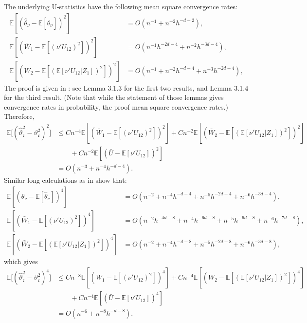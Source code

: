 \documentclass[11pt]{article}
\numberwithin{equation}{section}
\theoremstyle{definition}
\newcommand{\E}{\mathbb{E}}
\newcommand{\Scale}{\vartheta}
\begin{document}
The underlying U-statistics have the following mean square convergence rates:
\begin{align*}
    \E[(\widehat{\theta}_\nu   - \E[\widehat{\theta}_\nu])^2]             &= O(n^{-1}          + n^{-2}h^{-d-2}),\\
    \E[(\bar{W}_1 - \E[(\nu'U_{12})^2])^2]         &= O(n^{-1}h^{-2d-4} + n^{-2}h^{-3d-4}),\\
    \E[(\bar{W}_2 - \E[(\E[\nu'U_{12}|Z_1])^2])^2] &= O(n^{-1}          + n^{-2}h^{-d-4}  + n^{-3}h^{-2d-4}),
\end{align*}
The proof is given in \citet[Supplemental Appendix]{Cattaneo-Crump-Jansson_2014b_ET}: see Lemma 3.1.3 for the first two results, and Lemma 3.1.4 for the third result. %
(Note that while the statement of those lemmas gives convergence rates in probability, the proof mean square convergence rates.) Therefore,
\begin{align*}
    \E\Big[(\widehat{\Scale}_\mathfrak{c}^2 - \Scale_\mathfrak{c}^2)^2 \Big] 
    &\leq C n^{-4} \E[(\bar{W}_1 - \E[(\nu'U_{12})^2])^2] + C n^{-2} \E[(\bar{W}_2 - \E[(\E[\nu'U_{12}|Z_1])^2])^2]\\
    & \qquad + C n^{-2} \E[(\bar{U} - \E[\nu'U_{12}])^2] %
    \\
    &= O(n^{-3} + n^{-4}h^{-d-4}).
\end{align*}
Similar long calculations as in \citet[Supplemental Appendix]{Cattaneo-Crump-Jansson_2014b_ET} show that:
\begin{align*}
    \E[(\widehat{\theta}_\nu   - \E[\widehat{\theta}_\nu])^4]             &= O(n^{-2}          + n^{-4} h^{-d-4}  + n^{-5} h^{-2d-4} + n^{-6} h^{-3d-4}),\\
    \E[(\bar{W}_1 - \E[(\nu'U_{12})^2])^4]         &= O(n^{-2}h^{-4d-8} + n^{-4} h^{-6d-8} + n^{-5} h^{-6d-8} + n^{-6} h^{-7d-8}),\\
    \E[(\bar{W}_2 - \E[(\E[\nu'U_{12}|Z_1])^2])^4] &= O(n^{-2}          + n^{-4} h^{-d-8}  + n^{-5} h^{-2d-8} + n^{-6} h^{-3d-8}),
\end{align*}
which gives
\begin{align*}
    \E\Big[(\widehat{\Scale}_\mathfrak{c}^2 - \Scale_\mathfrak{c}^2)^4 \Big] 
    &\leq C n^{-8} \E[(\bar{W}_1 - \E[(\nu'U_{12})^2])^4] + C n^{-4} \E[(\bar{W}_2 - \E[(\E[\nu'U_{12}|Z_1])^2])^4]\\
    & \qquad + C n^{-4} \E[(\bar{U} - \E[\nu'U_{12}])^4]\\
    &= O(n^{-6} + n^{-8} h^{-d-8}).
\end{align*}
\end{document}
